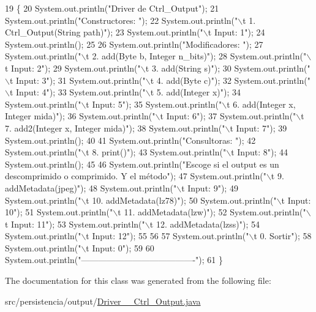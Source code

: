 \begin{DoxyCode}
19                                      \{
20         System.out.println(\textcolor{stringliteral}{"Driver de Ctrl\_Output"});
21         System.out.println(\textcolor{stringliteral}{"Constructores: "});
22         System.out.println(\textcolor{stringliteral}{"\(\backslash\)t 1. Ctrl\_Output(String path)"});
23         System.out.println(\textcolor{stringliteral}{"\(\backslash\)t Input: 1"});
24         System.out.println();
25 
26         System.out.println(\textcolor{stringliteral}{"Modificadores: "});
27         System.out.println(\textcolor{stringliteral}{"\(\backslash\)t 2. add(Byte b, Integer n\_bits)"});
28         System.out.println(\textcolor{stringliteral}{"\(\backslash\)t Input: 2"});
29         System.out.println(\textcolor{stringliteral}{"\(\backslash\)t 3. add(String s)"});
30         System.out.println(\textcolor{stringliteral}{"\(\backslash\)t Input: 3"});
31         System.out.println(\textcolor{stringliteral}{"\(\backslash\)t 4. add(Byte c)"});
32         System.out.println(\textcolor{stringliteral}{"\(\backslash\)t Input: 4"});
33         System.out.println(\textcolor{stringliteral}{"\(\backslash\)t 5. add(Integer x)"});
34         System.out.println(\textcolor{stringliteral}{"\(\backslash\)t Input: 5"});
35         System.out.println(\textcolor{stringliteral}{"\(\backslash\)t 6. add(Integer x, Integer mida)"});
36         System.out.println(\textcolor{stringliteral}{"\(\backslash\)t Input: 6"});
37         System.out.println(\textcolor{stringliteral}{"\(\backslash\)t 7. add2(Integer x, Integer mida)"});
38         System.out.println(\textcolor{stringliteral}{"\(\backslash\)t Input: 7"});
39         System.out.println();
40 
41         System.out.println(\textcolor{stringliteral}{"Consultoras: "});
42         System.out.println(\textcolor{stringliteral}{"\(\backslash\)t 8. print()"});
43         System.out.println(\textcolor{stringliteral}{"\(\backslash\)t Input: 8"});
44         System.out.println();
45 
46         System.out.println(\textcolor{stringliteral}{"Escoge si el output es un descomprimido o comprimido. Y el método"});
47         System.out.println(\textcolor{stringliteral}{"\(\backslash\)t 9. addMetadata(jpeg)"});
48         System.out.println(\textcolor{stringliteral}{"\(\backslash\)t Input: 9"});
49         System.out.println(\textcolor{stringliteral}{"\(\backslash\)t 10. addMetadata(lz78)"});
50         System.out.println(\textcolor{stringliteral}{"\(\backslash\)t Input: 10"});
51         System.out.println(\textcolor{stringliteral}{"\(\backslash\)t 11. addMetadata(lzw)"});
52         System.out.println(\textcolor{stringliteral}{"\(\backslash\)t Input: 11"});
53         System.out.println(\textcolor{stringliteral}{"\(\backslash\)t 12. addMetadata(lzss)"});
54         System.out.println(\textcolor{stringliteral}{"\(\backslash\)t Input: 12"});
55 
56 
57         System.out.println(\textcolor{stringliteral}{"\(\backslash\)t 0. Sortir"});
58         System.out.println(\textcolor{stringliteral}{"\(\backslash\)t Input: 0"});
59 
60         System.out.println(\textcolor{stringliteral}{"----------------------------------------"});
61     \}
\end{DoxyCode}


The documentation for this class was generated from the following file\+:\begin{DoxyCompactItemize}
\item 
src/persistencia/output/\hyperlink{Driver____Ctrl__Output_8java}{Driver\+\_\+\+\_\+\+Ctrl\+\_\+\+Output.\+java}\end{DoxyCompactItemize}
